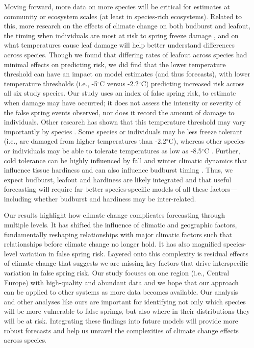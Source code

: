 \documentclass{article}\usepackage[]{graphicx}\usepackage[]{color}
\begin{document}
Moving forward, more data on more species will be critical for estimates at community or ecosystem scales (at least in species-rich ecosystems). Related to this, more research on the effects of climate change on both budburst and leafout, the timing when individuals are most at risk to spring freeze damage \citep{Chamberlain2019,Lenz2016}, and on what temperatures cause leaf damage will help better understand differences across species. Though we found that differing rates of leafout across species had minimal effects on predicting risk, we did find that the lower temperature threshold can have an impact on model estimates (and thus forecasts), with lower temperature thresholds (i.e., -5$^{\circ}$C versus -2.2$^{\circ}$C) predicting increased risk across all six study species. Our study uses an index of false spring risk, to estimate when damage may have occurred; it does not assess the intensity or severity of the false spring events observed, nor does it record the amount of damage to individuals. Other research has shown that this temperature threshold may vary importantly by species \citep{bennett2018globtherm, Korner2016, Lenz2013, Zhuo2018}. Some species or individuals may be less freeze tolerant (i.e., are damaged from higher temperatures than -2.2$^{\circ}$C), whereas other species or individuals may be able to tolerate temperatures as low as -8.5$^{\circ}$C \citep{Lenz2016}. Further, cold tolerance can be highly influenced by fall and winter climatic dynamics that influence tissue hardiness \citep{Charrier2011,Hofmann2015, Vitasse2014} and can also influence budburst timing \citep{Morin2007}. Thus, we expect budburst, leafout and hardiness are likely integrated and that useful forecasting will require far better species-specific models of all these factors---including whether budburst and hardiness may be inter-related. 

Our results highlight how climate change complicates forecasting through multiple levels. It has shifted the influence of climatic and geographic factors, fundamentally reshaping relationships with major climatic factors such that relationships before climate change no longer hold. It has also magnified species-level variation in false spring risk. Layered onto this complexity is residual effects of climate change that suggests we are missing key factors that drive interspecific variation in false spring risk. Our study focuses on one region (i.e., Central Europe) with high-quality and abundant data and we hope that our approach can be applied to other systems as more data becomes available. Our analysis and other analyses like ours are important for identifying not only which species will be more vulnerable to false springs, but also where in their distributions they will be at risk. Integrating these findings into future models will provide more robust forecasts and help us unravel the complexities of climate change effects across species.
\end{document}
